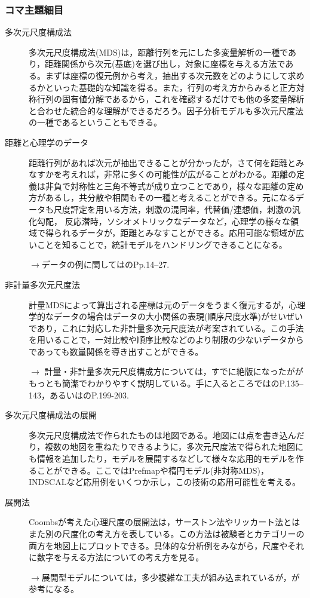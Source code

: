 \subsubsection{コマ主題細目}
\begin{description}
    \item[多次元尺度構成法] 多次元尺度構成法(MDS)は，距離行列を元にした多変量解析の一種であり，距離関係から次元(基底)を選び出し，対象に座標を与える方法である。まずは座標の復元例から考え，抽出する次元数をどのようにして求めるかといった基礎的な知識を得る。また，行列の考え方からみると正方対称行列の固有値分解であるから，これを確認するだけでも他の多変量解析と合わせた統合的な理解ができるだろう。因子分析モデルも多次元尺度法の一種であるということもできる。

    

    \item[距離と心理学のデータ] 距離行列があれば次元が抽出できることが分かったが，さて何を距離とみなすかを考えれば，非常に多くの可能性が広がることがわかる。距離の定義は非負で対称性と三角不等式が成り立つことであり，様々な距離の定め方があるし，共分散や相関もその一種と考えることができる。元になるデータも尺度評定を用いる方法，刺激の混同率，代替価/連想価，刺激の汎化勾配，    反応潜時，ソシオメトリックなデータなど，心理学の様々な領域で得られるデータが，距離とみなすことができる。応用可能な領域が広いことを知ることで，統計モデルをハンドリングできることになる。
    \begin{flushright}
        $\to$データの例に関しては\citet{高根芳雄1980-02}のPp.14--27.
    \end{flushright}
    \item[非計量多次元尺度法] 計量MDSによって算出される座標は元のデータをうまく復元するが，心理学的なデータの場合はデータの大小関係の表現(順序尺度水準)がせいぜいであり，これに対応した非計量多次元尺度法が考案されている。この手法を用いることで，一対比較や順序比較などのより制限の少ないデータからであっても数量関係を導き出すことができる。
    \begin{flushright}
        $\to$ 計量・非計量多次元尺度構成方については，すでに絶版になったが\citet{岡太彬訓1994-01-15}がもっとも簡潔でわかりやすく説明している。手に入るところでは\citet{足立浩平2006-07}のP.135--143，あるいは\citet{kosugi2019b}のP.199-203.
    \end{flushright}
    \item[多次元尺度構成法の展開]多次元尺度構成法で作られたものは地図である。地図には点を書き込んだり，複数の地図を重ねたりできるように，多次元尺度法で得られた地図にも情報を追加したり，モデルを展開するなどして様々な応用的モデルを作ることができる。ここではPrefmapや楕円モデル(非対称MDS)，INDSCALなど応用例をいくつか示し，この技術の応用可能性を考える。
    \item[展開法] Coombsが考えた心理尺度の展開法は，サーストン法やリッカート法とはまた別の尺度化の考え方を表している。この方法は被験者とカテゴリーの両方を地図上にプロットできる。具体的な分析例をみながら，尺度やそれに数字を与える方法についての考え方を見る。
    \begin{flushright}
        $\to$展開型モデルについては，多少複雑な工夫が組み込まれているが，\citet{shimizu2018}が参考になる。
    \end{flushright}


\end{description}
